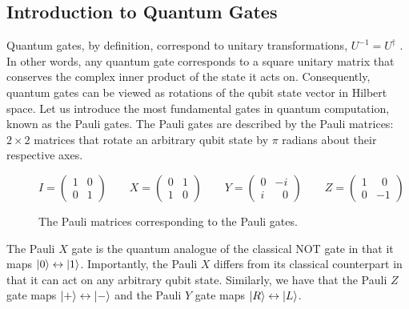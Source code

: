 \subsection{Introduction to Quantum Gates}%
\label{quantum-gates}

Quantum gates, by definition, correspond to unitary transformations, $U^{-1} = U^\dagger$ \cite{Nielsen2012}. In other words, any quantum gate corresponds to a square unitary matrix that conserves the complex inner product of the state it acts on. Consequently, quantum gates can be viewed as rotations of the qubit state vector in Hilbert space. Let us introduce the most fundamental gates in quantum computation, known as the Pauli gates. The Pauli gates are described by the Pauli matrices: $2 \times 2$ matrices that rotate an arbitrary qubit state by $\pi$ radians about their respective axes.

\begin{figure}[H]
    \centering
    \begin{equation*}
        I = \begin{pmatrix} 1 & 0 \\ 0 & 1\end{pmatrix} \qquad
        X = \begin{pmatrix} 0 & 1 \\ 1 & 0\end{pmatrix} \qquad
        Y = \begin{pmatrix} 0 & -i \\ i & \,\,\,\,0\end{pmatrix} \qquad
        Z = \begin{pmatrix} 1 & \,\,\,0 \\ 0 & -1\end{pmatrix}
    \end{equation*}
    \caption{The Pauli matrices corresponding to the Pauli gates.}
    \label{pauli-matrices}
\end{figure}

The Pauli $X$ gate is the quantum analogue of the classical NOT gate in that it maps $\ket 0 \leftrightarrow \ket 1$. Importantly, the Pauli $X$ differs from its classical counterpart in that it can act on any arbitrary qubit state. Similarly, we have that the Pauli $Z$ gate maps $\ket + \leftrightarrow \ket -$ and the Pauli $Y$ gate maps $\ket R \leftrightarrow \ket L$.


